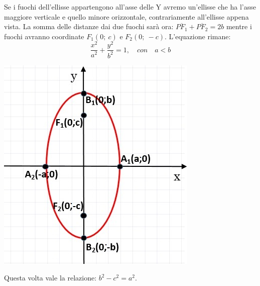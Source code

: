 \noindent \begin{minipage}{.59\textwidth}
   Se i fuochi dell'ellisse appartengono all'asse delle Y avremo 
un'ellisse che ha l'asse maggiore verticale e quello minore orizzontale,
contrariamente all'ellisse appena vista. La somma delle 
distanze dai due fuochi sarà ora: \(\overline{PF_{1}}+\overline{PF_{2}}=2b\) 
mentre i fuochi avranno coordinate \( F_{1} (0;~c)\) e \( F_{2} (0;~-c)\). 
L'equazione rimane:
\[\dfrac{x^{2}}{a^{2}}+\dfrac{y^{2}}{b^{2}}=1, \quad con  \quad a<b\]
\end{minipage}
 \hfill
 \begin{minipage}{.39\textwidth}
      \begin{inaccessibleblock}
\includegraphics[width=\textwidth]{img/ellisseassey.jpg}
\end{inaccessibleblock} 
\end{minipage}

\vspace{8pt}

\noindent Questa volta vale la relazione: \(b^{2}-c^{2}=a^{2}\).\\

